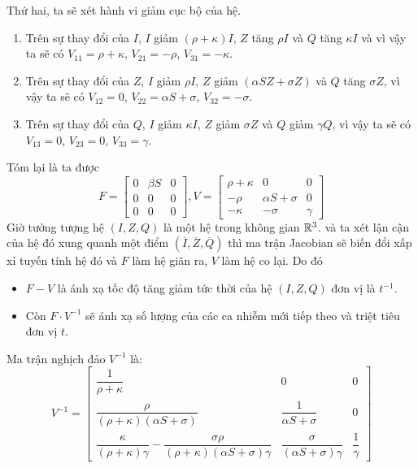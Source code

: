 \documentclass[12pt]{scrartcl}
\begin{document}
Thứ hai, ta sẽ xét hành vi giảm cục bộ của hệ. 
\begin{enumerate}
    \item Trên sự thay đổi của $I$, $I$ giảm $(\rho + \kappa)I$, $Z$ tăng $\rho I$ và $Q$ tăng $\kappa I$ và vì vậy ta sẽ có $V_{11} = \rho + \kappa$, $V_{21} = -\rho$, $V_{31} = -\kappa$.
    \item Trên sự thay đổi của $Z$, $I$ giảm $\rho I$, $Z$ giảm $(\alpha SZ + \sigma Z)$ và $Q$ tăng $\sigma Z$, vì vậy ta sẽ có $V_{12} =0$, $V_{22} = \alpha S + \sigma$, $V_{32} = -\sigma$.
    \item Trên sự thay đổi của $Q$, $I$ giảm $\kappa I$, $Z$ giảm $\sigma Z$ và $Q$ giảm $\gamma Q$, vì vậy ta sẽ có $V_{13} = 0$, $V_{23} = 0$, $V_{33} = \gamma$.
\end{enumerate}
Tóm lại là ta được 
\[
    F = \begin{bmatrix}
        0 & \beta S & 0 \\
        0 & 0 & 0 \\
        0 & 0 & 0
    \end{bmatrix},
    V = \begin{bmatrix}
        \rho + \kappa & 0 & 0 \\
        -\rho & \alpha S + \sigma & 0 \\
        -\kappa & -\sigma& \gamma                                                              
    \end{bmatrix}
\]
Giờ tưởng tượng hệ $(I,Z,Q)$ là một hệ trong không gian $\mathbb{R}^3$. và ta xét lận cận của hệ đó xung quanh một điểm $(\overline{I},\overline{Z},\overline{Q})$ thì ma trận Jacobian sẽ biến đổi xấp xỉ tuyến tính hệ đó và $F$ làm hệ giãn ra, $V$ làm hệ co lại. Do đó 
\begin{itemize}
    \item $F - V$ là ánh xạ tốc độ tăng giảm tức thời của hệ $(I,Z,Q)$ đơn vị là $t^{-1}$.
    \item Còn $F\cdot V^{-1}$ sẽ ánh xạ số lượng của các ca nhiễm mới tiếp theo và triệt tiêu đơn vị $t$.
\end{itemize}
Ma trận nghịch đảo \(V^{-1}\) là:
\[
V^{-1} =
\begin{bmatrix}
\dfrac{1}{\rho+\kappa} & 0 & 0 \\[12pt]
\dfrac{\rho}{(\rho+\kappa)(\alpha S+\sigma)} & \dfrac{1}{\alpha S+\sigma} & 0 \\[12pt]
\dfrac{\kappa}{(\rho+\kappa)\gamma} - \dfrac{\sigma\rho}{(\rho+\kappa)(\alpha S+\sigma)\gamma} &
\dfrac{\sigma}{(\alpha S+\sigma)\gamma} &
\dfrac{1}{\gamma}
\end{bmatrix}
\]
\end{document}
